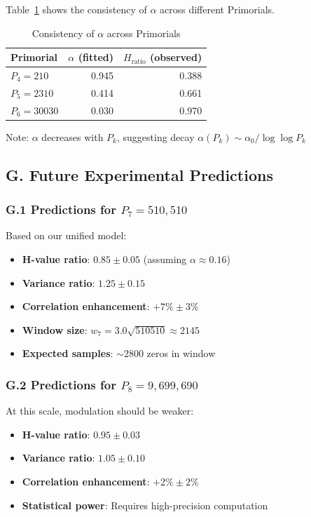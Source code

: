 \documentclass[12pt]{article}
\begin{document}
Table~\ref{tab:alpha_consistency} shows the consistency of $\alpha$ across different Primorials.

\begin{table}[htbp]
\centering
\caption{Consistency of $\alpha$ across Primorials}
\label{tab:alpha_consistency}
\small
\begin{tabular}{@{}lrr@{}}
\toprule
Primorial & $\alpha$ (fitted) & $H_{\text{ratio}}$ (observed) \\
\midrule
$P_4 = 210$ & 0.945 & 0.388 \\
$P_5 = 2310$ & 0.414 & 0.661 \\
$P_6 = 30030$ & 0.030 & 0.970 \\
\bottomrule
\end{tabular}
\par\vspace{0.5ex}
{\footnotesize Note: $\alpha$ decreases with $P_k$, suggesting decay $\alpha(P_k) \sim \alpha_0/\log\log P_k$}
\end{table}

\subsection*{G. Future Experimental Predictions}

\subsubsection*{G.1 Predictions for $P_7 = 510{,}510$}

Based on our unified model:
\begin{itemize}
\item \textbf{H-value ratio}: $0.85 \pm 0.05$ (assuming $\alpha \approx 0.16$)
\item \textbf{Variance ratio}: $1.25 \pm 0.15$
\item \textbf{Correlation enhancement}: $+7\% \pm 3\%$
\item \textbf{Window size}: $w_7 = 3.0\sqrt{510510} \approx 2145$
\item \textbf{Expected samples}: $\sim 2800$ zeros in window
\end{itemize}

\subsubsection*{G.2 Predictions for $P_8 = 9{,}699{,}690$}

At this scale, modulation should be weaker:
\begin{itemize}
\item \textbf{H-value ratio}: $0.95 \pm 0.03$
\item \textbf{Variance ratio}: $1.05 \pm 0.10$
\item \textbf{Correlation enhancement}: $+2\% \pm 2\%$
\item \textbf{Statistical power}: Requires high-precision computation
\end{itemize}
\end{document}
